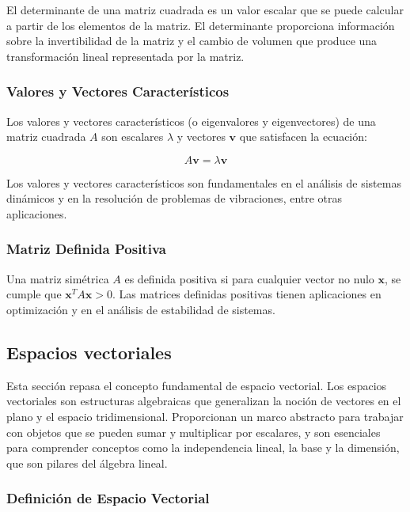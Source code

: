 El determinante de una matriz cuadrada es un valor escalar que se puede calcular a partir de los elementos de la matriz.  El determinante proporciona información sobre la invertibilidad de la matriz y el cambio de volumen que produce una transformación lineal representada por la matriz.

\subsubsection{Valores y Vectores Característicos}

Los valores y vectores característicos (o eigenvalores y eigenvectores) de una matriz cuadrada $A$ son escalares $\lambda$ y vectores $\mathbf{v}$ que satisfacen la ecuación:

\begin{equation}
	A\mathbf{v} = \lambda \mathbf{v}
\end{equation}

Los valores y vectores característicos son fundamentales en el análisis de sistemas dinámicos y en la resolución de problemas de vibraciones, entre otras aplicaciones.

\subsubsection{Matriz Definida Positiva}

Una matriz simétrica $A$ es definida positiva si para cualquier vector no nulo $\mathbf{x}$, se cumple que $\mathbf{x}^T A \mathbf{x} > 0$.  Las matrices definidas positivas tienen aplicaciones en optimización y en el análisis de estabilidad de sistemas.

\subsection{Espacios vectoriales}

Esta sección repasa el concepto fundamental de espacio vectorial. Los espacios vectoriales son estructuras algebraicas que generalizan la noción de vectores en el plano y el espacio tridimensional.  Proporcionan un marco abstracto para trabajar con objetos que se pueden sumar y multiplicar por escalares, y son esenciales para comprender conceptos como la independencia lineal, la base y la dimensión, que son pilares del álgebra lineal.

\subsubsection{Definición de Espacio Vectorial}

